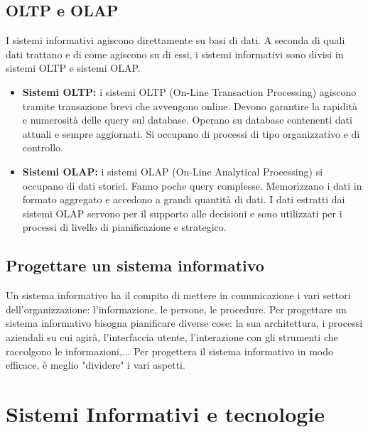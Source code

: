 \documentclass[\main/main.tex]{subfiles}
\begin{document}
\subsection{OLTP e OLAP}
I sistemi informativi agiscono direttamente su basi di dati. A seconda di quali dati trattano e di come agiscono su di essi, i sistemi informativi sono divisi in sistemi OLTP e sistemi OLAP.
\begin{itemize}
\item \textbf{Sistemi OLTP:} i sistemi OLTP (On-Line Transaction Processing) agiscono tramite transazione brevi che avvengono online. Devono garantire la rapidità e numerosità delle query sul database. Operano su database contenenti dati attuali e sempre aggiornati. Si occupano di processi di tipo organizzativo e di controllo. 
\item \textbf{Sistemi OLAP:} i sistemi OLAP (On-Line Analytical Processing) si occupano di dati storici. Fanno poche query complesse. Memorizzano i dati in formato aggregato e accedono a grandi quantità di dati. I dati estratti dai sistemi OLAP servono per il supporto alle decisioni e sono utilizzati per i processi di livello di pianificazione e strategico. 
\end{itemize}


\subsection{Progettare un sistema informativo}
Un sistema informativo ha il compito di mettere in comunicazione i vari settori dell'organizzazione: l'informazione, le persone, le procedure. 
Per progettare un sistema informativo bisogna pianificare diverse cose: la sua architettura, i processi aziendali su cui agirà, l'interfaccia utente, l'interazione con gli strumenti che raccolgono le informazioni,...
Per progettera il sistema informativo in modo efficace, è meglio "dividere" i vari aspetti.


\section{Sistemi Informativi e tecnologie}
\end{document}
